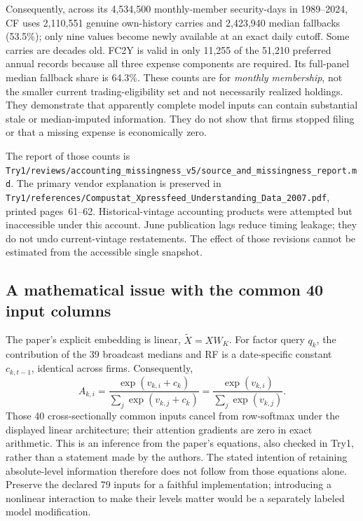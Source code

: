 \documentclass[11pt]{article}
\begin{document}
Consequently, across its 4,534,500 monthly-member security-days in 1989--2024, CF uses 2,110,551 genuine own-history carries and 2,423,940 median fallbacks (53.5\%); only nine values become newly available at an exact daily cutoff. Some carries are decades old. FC2Y is valid in only 11,255 of the 51,210 preferred annual records because all three expense components are required. Its full-panel median fallback share is 64.3\%. These counts are for \emph{monthly membership}, not the smaller current trading-eligibility set and not necessarily realized holdings. They demonstrate that apparently complete model inputs can contain substantial stale or median-imputed information. They do not show that firms stopped filing or that a missing expense is economically zero.

The report of those counts is \nolinkurl{Try1/reviews/accounting_missingness_v5/source_and_missingness_report.md}. The primary vendor explanation is preserved in \nolinkurl{Try1/references/Compustat_Xpressfeed_Understanding_Data_2007.pdf}, printed pages~61--62. Historical-vintage accounting products were attempted but inaccessible under this account. June publication lags reduce timing leakage; they do not undo current-vintage restatements. The effect of those revisions cannot be estimated from the accessible single snapshot.

\subsection{A mathematical issue with the common 40 input columns}
The paper's explicit embedding is linear, $\widetilde X=XW_K$. For factor query $q_k$, the contribution of the 39 broadcast medians and RF is a date-specific constant $c_{k,t-1}$, identical across firms. Consequently,
\[
 A_{k,i}=\frac{\exp(v_{k,i}+c_k)}{\sum_j\exp(v_{k,j}+c_k)}
       =\frac{\exp(v_{k,i})}{\sum_j\exp(v_{k,j})}.
\]
Those 40 cross-sectionally common inputs cancel from row-softmax under the displayed linear architecture; their attention gradients are zero in exact arithmetic. This is an inference from the paper's equations, also checked in Try1, rather than a statement made by the authors. The stated intention of retaining absolute-level information therefore does not follow from those equations alone. Preserve the declared 79 inputs for a faithful implementation; introducing a nonlinear interaction to make their levels matter would be a separately labeled model modification.


\end{document}
